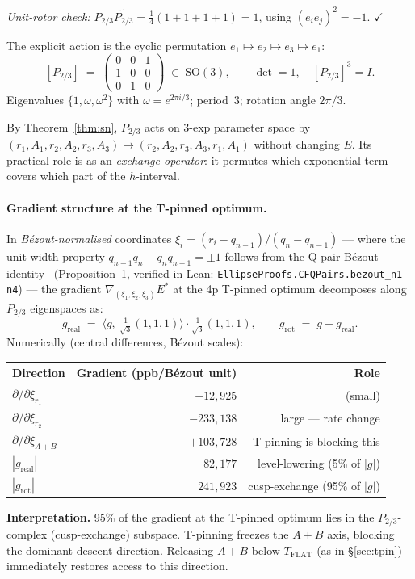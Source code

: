 \documentclass[12pt]{article}
\begin{document}
\noindent\emph{Unit-rotor check:} $P_{2/3}\widetilde{P_{2/3}}=\tfrac{1}{4}(1{+}1{+}1{+}1)=1$,
using $(e_ie_j)^2=-1$.  $\checkmark$

The explicit action is the cyclic permutation $e_1\mapsto e_2\mapsto e_3\mapsto e_1$:
\[
[P_{2/3}] \;=\; \begin{pmatrix}0&0&1\\1&0&0\\0&1&0\end{pmatrix}
\;\in\; \mathrm{SO}(3), \qquad \det=1, \quad [P_{2/3}]^3=I.
\]
Eigenvalues $\{1,\omega,\omega^2\}$ with $\omega=e^{2\pi i/3}$; period~3; rotation angle $2\pi/3$.

By Theorem~\ref{thm:sn}, $P_{2/3}$ acts on 3-exp parameter space by
$(r_1,A_1,r_2,A_2,r_3,A_3)\mapsto(r_2,A_2,r_3,A_3,r_1,A_1)$
without changing $E$.  Its practical role is as an \emph{exchange operator}: it
permutes which exponential term covers which part of the $h$-interval.

\paragraph{Gradient structure at the T-pinned optimum.}
In \emph{Bézout-normalised} coordinates
$\xi_i = (r_i - q_{n-1})/(q_n - q_{n-1})$ — where the unit-width property
$q_{n-1}q_n - q_nq_{n-1} = \pm 1$ follows from the Q-pair Bézout identity~\cite{zwdeng2023}
(Proposition~1, verified in Lean: \texttt{EllipseProofs.CFQPairs.bezout\_n1}--\texttt{n4}) — the gradient
$\nabla_{(\xi_1,\xi_2,\xi_3)} E^*$ at the 4p T-pinned optimum
decomposes along $P_{2/3}$ eigenspaces as:
\[
g_{\mathrm{real}} \;=\; \langle g,\,\tfrac{1}{\sqrt3}(1,1,1)\rangle
                     \cdot \tfrac{1}{\sqrt3}(1,1,1), \qquad
g_{\mathrm{rot}} \;=\; g - g_{\mathrm{real}}.
\]
Numerically (central differences, Bézout scales):
\begin{center}
\begin{tabular}{lrr}
\toprule
Direction & Gradient (ppb/Bézout unit) & Role \\
\midrule
$\partial/\partial\xi_{r_1}$ & $-12{,}925$ & (small) \\
$\partial/\partial\xi_{r_2}$ & $-233{,}138$ & large — rate change \\
$\partial/\partial\xi_{A+B}$ & $+103{,}728$ & T-pinning is blocking this \\
\midrule
$|g_{\mathrm{real}}|$ & $82{,}177$ & level-lowering (5\% of $|g|$) \\
$|g_{\mathrm{rot}}|$  & $241{,}923$ & cusp-exchange (95\% of $|g|$) \\
\bottomrule
\end{tabular}
\end{center}
\noindent\textbf{Interpretation.}  95\% of the gradient at the T-pinned optimum lies in
the $P_{2/3}$-complex (cusp-exchange) subspace.  T-pinning freezes the $A+B$ axis,
blocking the dominant descent direction.  Releasing $A+B$ below $T_{\mathrm{FLAT}}$
(as in \S\ref{sec:tpin}) immediately restores access to this direction.
\end{document}
